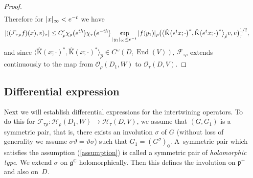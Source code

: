 \documentclass[11pt]{article}
\numberwithin{equation}{section}
\newcommand{\BC}{\mathbb{C}}
\newcommand{\fg}{\mathfrak{g}}
\newcommand{\fp}{\mathfrak{p}}
\newcommand{\cF}{\mathcal{F}}
\newcommand{\cH}{\mathcal{H}}
\newcommand{\cO}{\mathcal{O}}
\newcommand{\rK}{\mathrm{K}}
\newcommand{\End}{\operatorname{End}}
\begin{document}
\begin{proof}
\begin{align*}
\end{align*}
Therefore for $|x|_\infty<{\rm e}^{-t}$ we have
\begin{gather*}
 |((\cF_{\tau\rho}f)(x),v)_\tau|
\le C_\rho'\chi_\rho\big({\rm e}^{t\hbar}\big)\chi_\tau\big({\rm e}^{-t\hbar}\big)\sup_{|y_1|_\infty\le {\rm e}^{-t}}|f(y_1)|_\rho
\big(\big\langle\hat{\rK}\big({\rm e}^tx;\cdot\big)^*,\hat{\rK}\big({\rm e}^tx;\cdot\big)^*\big\rangle_{\hat{\rho}}v,v\big)_\tau^{1/2},
\end{gather*}
and since $\big\langle\hat{\rK}(x;\cdot)^*,\hat{\rK}(x;\cdot)^*\big\rangle_{\hat{\rho}}\in C^\omega(D,\End(V))$,
$\cF_{\tau\rho}$ extends continuously to the map from $\cO_\rho(D_1,W)$ to $\cO_\tau(D,V)$.
\end{proof}

\subsection{Differential expression}
Next we will establish differential expressions for the intertwining operators.
To do this for $\cF_{\tau\rho}\colon \cH_\rho(D_1,W)\to \cH_\tau(D,V)$, we assume that $(G,G_1)$ is a symmetric pair, that is,
there exists an involution $\sigma$ of $G$ (without loss of generality we assume $\sigma\vartheta=\vartheta\sigma$) such that $G_1=(G^\sigma)_0$.
A~symmetric pair which satisfies the assumption (\ref{assumption}) is called a symmetric pair of \textit{holomorphic type}.
We extend $\sigma$ on $\fg^\BC$ holomorphically. Then this defines the involution on $\fp^+$ and also on~$D$.
\end{document}
